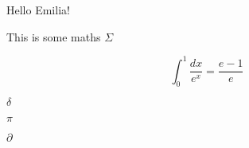 \documentclass{article}
\begin{document}
Hello Emilia!

This is some maths $\Sigma$

\[ \int_0^1 \frac{dx}{e^x} = \frac{e-1}{e} \]

$\delta$

$\pi$

$\partial$
\end{document}
